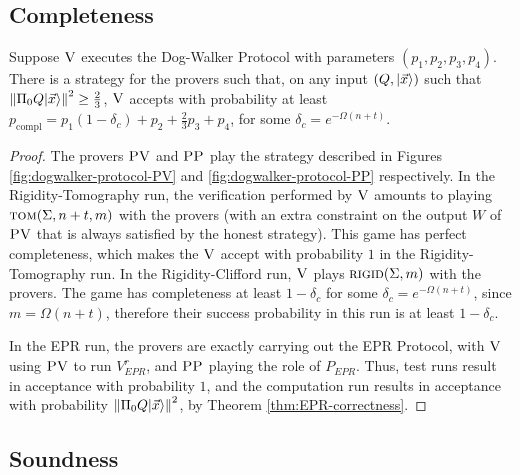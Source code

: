 \subsection{Completeness}

\begin{lemma}\label{lem:dogwalker-completeness}
Suppose $\textsc{V}$ executes the Dog-Walker Protocol with parameters $(p_1,p_2,p_3,p_4)$.
There is a strategy for the provers such that, on any input $(Q,|\vec{x}\rangle)$
  such that $\left\|\Pi_0 Q|\vec{x}\rangle\right\|^2\geq \frac{2}{3}$, $\textsc{V}$ accepts with
  probability at least
  $p_{\mathrm{compl}}=p_1(1-\delta_c)+p_2+\frac{2}{3}p_3+p_4$, for some $\delta_c = e^{-\Omega(n+t)}$.
\end{lemma}

\begin{proof}
The provers $\textsc{PV}$ and $\textsc{PP}$ play the strategy described in Figures
  \ref{fig:dogwalker-protocol-PV} and \ref{fig:dogwalker-protocol-PP}
  respectively. In the Rigidity-Tomography run, the verification performed by
  $\textsc{V}$ amounts to playing $\textsc{tom}(\Sigma,n+t,m)$ with the provers (with an extra
  constraint on the output $W$ of $\textsc{PV}$ that is always satisfied by the honest
  strategy). This game has perfect
  completeness, which makes the $\textsc{V}$
  accept with probability $1$ in the Rigidity-Tomography run.
  In the Rigidity-Clifford run, $\textsc{V}$ plays $\textsc{rigid}(\Sigma,m)$
  with the provers. The game
  has completeness at least $1-\delta_c$ for some $\delta_c=e^{-\Omega(n+t)}$,
  since $m=\Omega(n+t)$, therefore their success probability in this run is
  at least $1-\delta_c$.

In the EPR run, the provers are exactly carrying out the EPR Protocol, with $\textsc{V}$ using $\textsc{PV}$ to run $V_{EPR}^r$, and $\textsc{PP}$ playing the role of $P_{EPR}$. Thus, test runs result in acceptance with probability $1$, and the computation run results in acceptance with probability $\left\|\Pi_0 Q|\vec{x}\rangle\right\|^2$, by Theorem \ref{thm:EPR-correctness}. 
\end{proof}


\subsection{Soundness}

